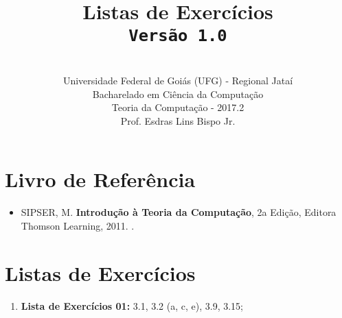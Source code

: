 \documentclass[12pt,a4paper,oneside]{article}
\author{\\Universidade Federal de Goiás (UFG) - Regional Jataí\\Bacharelado em Ciência da Computação \\Teoria da Computação - 2017.2 \\Prof. Esdras Lins Bispo Jr.}
\date{}
\title{
	\sc \huge Listas de Exercícios
	\\{\tt Versão 1.0}
}
\begin{document}
\maketitle

\section{Livro de Referência}
	\begin{itemize}
		\item SIPSER, M. {\bf Introdução à Teoria da Computação}, 2a Edição, Editora Thomson Learning, 2011. \color{blue}{\bf Código Bib.: [004 SIP/int]}.
	\end{itemize}
	
\section{Listas de Exercícios}

\begin{enumerate}

	\subsection{Teste 1}
	\item[] {\bf Lista de Exercícios 01:} 3.1, 3.2 (a, c, e), 3.9, 3.15;
	
%	
%	
%		
%	
%	
	
\end{enumerate}
\end{document}
